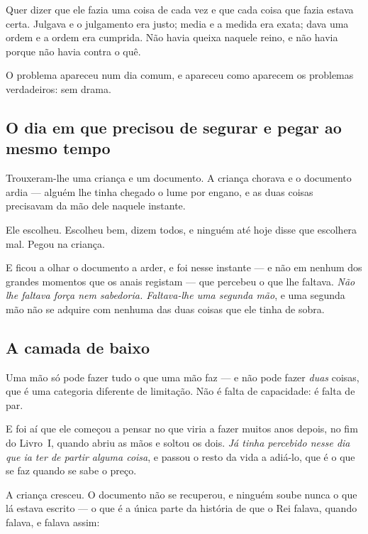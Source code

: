 \documentclass[livro.tex]{subfiles}
\begin{document}
\medskip

Quer dizer que ele fazia uma coisa de cada vez e que cada coisa que fazia estava certa. Julgava e
o julgamento era justo; media e a medida era exata; dava uma ordem e a ordem era cumprida. Não
havia queixa naquele reino, e não havia porque não havia contra o quê.

\medskip

O problema apareceu num dia comum, e apareceu como aparecem os problemas verdadeiros: sem drama.

\subsection*{O dia em que precisou de segurar e pegar ao mesmo tempo}

Trouxeram-lhe uma criança e um documento. A criança chorava e o documento ardia --- alguém lhe
tinha chegado o lume por engano, e as duas coisas precisavam da mão dele naquele instante.

\medskip

Ele escolheu. Escolheu bem, dizem todos, e ninguém até hoje disse que escolhera mal. Pegou na
criança.

\medskip

E ficou a olhar o documento a arder, e foi nesse instante --- e não em nenhum dos grandes momentos
que os anais registam --- que percebeu o que lhe faltava. \emph{Não lhe faltava força nem
sabedoria. Faltava-lhe uma segunda mão}, e uma segunda mão não se adquire com nenhuma das duas
coisas que ele tinha de sobra.

\subsection*{A camada de baixo}

Uma mão só pode fazer tudo o que uma mão faz --- e não pode fazer \emph{duas} coisas, que é uma
categoria diferente de limitação. Não é falta de capacidade: é falta de par.

\medskip

E foi aí que ele começou a pensar no que viria a fazer muitos anos depois, no fim do Livro~I,
quando abriu as mãos e soltou os dois. \emph{Já tinha percebido nesse dia que ia ter de partir
alguma coisa}, e passou o resto da vida a adiá-lo, que é o que se faz quando se sabe o preço.

\medskip

A criança cresceu. O documento não se recuperou, e ninguém soube nunca o que lá estava escrito ---
o que é a única parte da história de que o Rei falava, quando falava, e falava assim:
\end{document}
